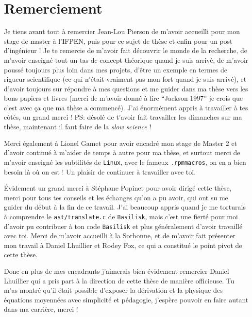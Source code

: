 \chapter*{\centering Remerciement}
\noindent 
Je tiens avant tout à remercier Jean-Lou Pierson de m'avoir accueilli pour mon stage de master à l'IFPEN, puis pour ce sujet de thèse et enfin pour un post d'ingénieur ! 
Je te remercie de m'avoir fait découvrir le monde de la recherche, 
de m'avoir enseigné tout un tas de concept théorique quand je suis arrivé, 
de m'avoir poussé toujours plus loin dans mes projets, 
d'être un exemple en termes de rigueur scientifique (ce qui n'était vraiment pas mon fort quand je suis arrivé), et 
d'avoir toujours sur répondre à mes questions et me guider dans ma thèse vers les bons papiers et livres (merci de m'avoir donné à lire ``Jackson 1997'' je crois que c'est avec ça que ma thèse a commencé).
J'ai énormément  appris à travailler à tes côtés, un grand merci !
PS: désolé de t'avoir fait travailler les dimanches sur ma thèse,  maintenant il faut faire de la \textit{slow science} ! 

Merci également à Lionel Gamet pour avoir encadré mon stage de Master 2 et d'avoir continué à m'aider de temps à autre pour ma thèse, et surtout merci de m'avoir enseigné les subtilités de \texttt{Linux}, avec le fameux \texttt{.rpmmacros}, on en a bien besoin là où on est !  
Un plaisir de continuer à travailler avec toi.
 
\'Evidement un grand merci à Stéphane Popinet pour avoir dirigé cette thèse, merci pour tous tes conseils et les échanges qu'on a pu avoir, qui ont su me guider du début à la fin de ce travail. 
J'ai beaucoup appris quand je me torturais à comprendre le \texttt{ast/translate.c} de \texttt{Basilisk}, mais c'est une fierté pour moi d'avoir pu contribuer à ton code \texttt{Basilisk} et plus généralement d'avoir travaillé avec toi. 
Merci de m'avoir accueilli à la Sorbonne, et de m'avoir fait présenter mon travail à Daniel Lhuillier et Rodey Fox, ce qui a constitué le point pivot de cette thèse.  

Donc en plus de mes encadrants j'aimerais bien évidement remercier Daniel Lhuillier qui a pris part à la direction de cette thèse de manière  officieuse. 
Tu m'as montré qu'il était possible d'exposer la dérivation et la physique des équations moyennées avec simplicité et pédagogie, j'espère pouvoir en faire autant dans ma carrière, merci !  

